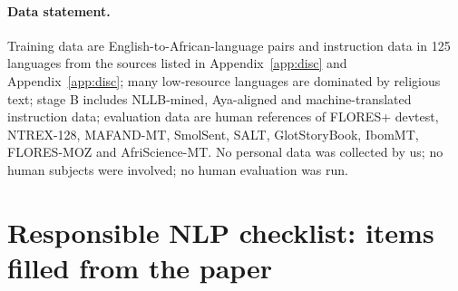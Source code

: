 \paragraph{Data statement.} Training data are English-to-African-language pairs and instruction data in 125 languages from the sources listed in Appendix~\ref{app:disc} and Appendix~\ref{app:disc}; many low-resource languages are dominated by religious text; stage B includes NLLB-mined, Aya-aligned and machine-translated instruction data; evaluation data are human references of FLORES+ devtest, NTREX-128, MAFAND-MT, SmolSent, SALT, GlotStoryBook, IbomMT, FLORES-MOZ and AfriScience-MT. No personal data was collected by us; no human subjects were involved; no human evaluation was run.

\section{Responsible NLP checklist: items filled from the paper}\label{app:rnlp}

